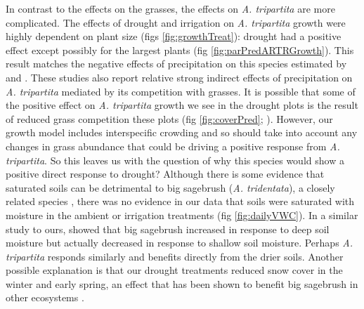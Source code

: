 \documentclass[11pt]{article}
\begin{document}
\begin{doublespacing}
In contrast to the effects on the grasses, the effects on \textit{A. tripartita} are more complicated. The effects of drought and irrigation on \textit{A. tripartita} growth were highly dependent on plant size (figs \ref{fig:growthTreat}): drought had a positive effect except possibly for the largest plants (fig \ref{fig:parPredARTRGrowth}). This result matches the negative effects of precipitation on this species estimated by \citep{adler_forecasting_2012} and \citep{chu_direct_2016}. These studies also report relative strong indirect effects of precipitation on \textit{A. tripartita} mediated by its competition with grasses. It is possible that some of the positive effect on \textit{A. tripartita} growth we see in the drought plots is the result of reduced grass competition these plots (fig \ref{fig:coverPred}; \citep{chu_direct_2016}). However, our growth model includes interspecific crowding and so should take into account any changes in grass abundance that could be driving a positive response from \textit{A. tripartita}. So this leaves us with the question of why this species would show a positive direct response to drought? Although there is some evidence that saturated soils can be detrimental to big sagebrush (\textit{A. tridentata}), a closely related species \citep{sturges_response_1989}, there was no evidence in our data that soils were saturated with moisture in the ambient or irrigation treatments (fig \ref{fig:dailyVWC}). In a similar study to ours, \citep{germino_desert_2014} showed that big sagebrush increased in response to deep soil moisture but actually decreased in response to shallow soil moisture. Perhaps \textit{A. tripartita} responds similarly and benefits directly from the drier soils. Another possible explanation is that our drought treatments reduced snow cover in the winter and early spring, an effect that has been shown to benefit big sagebrush in other ecosystems \citep{perfors_enhanced_2003}. 


\end{doublespacing}
\end{document}
